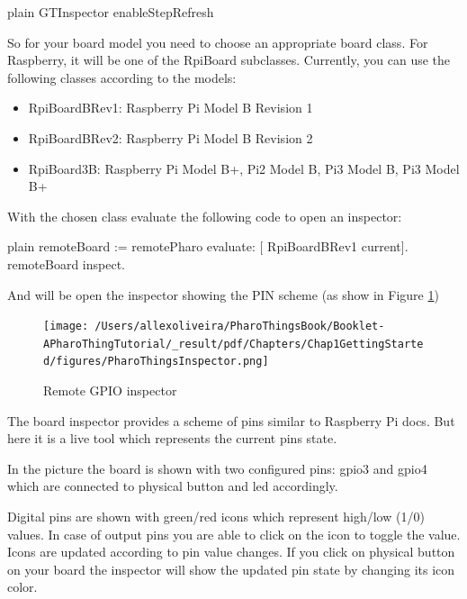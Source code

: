 \documentclass[10pt,twoside,english]{_support/latex/sbabook/sbabook}
\begin{document}
\begin{displaycode}{plain}
GTInspector enableStepRefresh
\end{displaycode}

So for your board model you need to choose an appropriate board class. For Raspberry, it will be one of the RpiBoard subclasses. Currently, you can use the following classes according to the models:

\begin{itemize}
\item RpiBoardBRev1: Raspberry Pi Model B Revision 1
\item RpiBoardBRev2: Raspberry Pi Model B Revision 2
\item RpiBoard3B: Raspberry Pi Model B+, Pi2 Model B, Pi3 Model B, Pi3 Model B+
\end{itemize}

With the chosen class evaluate the following code to open an inspector:

\begin{displaycode}{plain}
remoteBoard := remotePharo evaluate: [ RpiBoardBRev1 current].
remoteBoard inspect.
\end{displaycode}

And will be open the inspector showing the PIN scheme (as show in Figure \ref{PharoThingsinspector})


\begin{figure}

\begin{center}
\texttt{[image: /Users/allexoliveira/PharoThingsBook/Booklet-APharoThingTutorial/\_result/pdf/Chapters/Chap1GettingStarted/figures/PharoThingsInspector.png]}\caption{Remote GPIO inspector\label{PharoThingsinspector}}\end{center}
\end{figure}


The board inspector provides a scheme of pins similar to Raspberry Pi docs. But here it is a live tool which represents the current pins state.

In the picture the board is shown with two configured pins: gpio3 and gpio4 which are connected to physical button and led accordingly.

Digital pins are shown with green/red icons which represent high/low (1/0) values. In case of output pins you are able to click on the icon to toggle the value. Icons are updated according to pin value changes. If you click on physical button on your board the inspector will show the updated pin state by changing its icon color.
\end{document}
